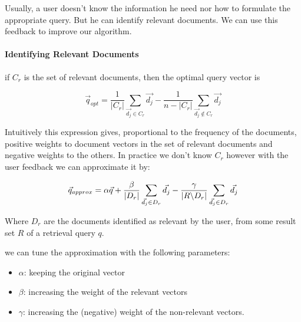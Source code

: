 Usually, a user doesn't know the information he need nor how to formulate the appropriate query. But he can identify relevant documents. We can use this feedback to improve our algorithm.
\paragraph{Identifying Relevant Documents}
if $C_r$ is the set of relevant documents, then the optimal query vector is 

\[ \vec{q}_{opt} = \frac{1}{|C_r|} \sum_{\vec{d_j} \in C_r} \vec{d_j} - \frac{1}{n-|C_r|} \sum_{\vec{d_j} \not \in C_r} \vec{d_j} \]

Intuitively this expression gives, proportional to the frequency of the documents, positive weights to document vectors in the set of relevant documents and negative weights to the others. In practice we don't know $C_r$ however with the user feedback we can approximate it by:

\[ \vec{q}_{approx} = \alpha\vec{q} + \frac{\beta}{|D_r|}\sum_{\vec{d_j} \in D_r} \vec{d_j} - \frac{\gamma}{\abs{R\symbol{92}D_r}} \sum_{\vec{d_j} \in D_r} \vec{d_j} \]

Where $D_r$ are the documents identified as relevant by the user, from some result set $R$ of a retrieval query $q$.

we can tune the approximation with the following parameters:
\begin{itemize}
\item $\alpha$: keeping the original vector
\item $\beta$: increasing the weight of the relevant vectors
\item $\gamma$: increasing the (negative) weight of the non-relevant vectors.
\end{itemize}

\afterpage{\null\newpage}